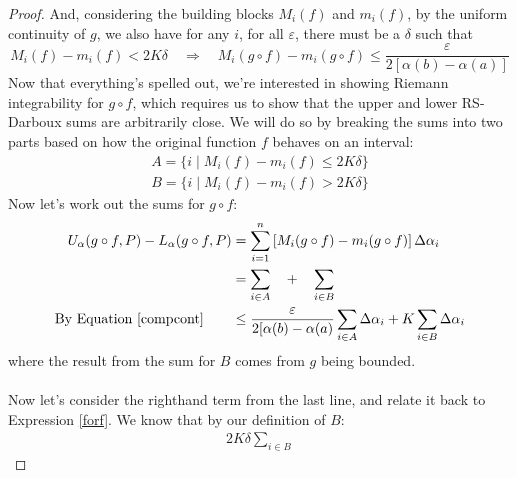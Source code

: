 \documentclass[12pt]{article}
\theoremstyle{plain}
\theoremstyle{definition}
\theoremstyle{remark}
\begin{document}
\begin{itemize}
\begin{proof}
            And, considering the building blocks $M_i(f)$ and 
            $m_i(f)$, by the uniform continuity of $g$, we
            also have for any $i$, for all $\varepsilon$, there must
            be a $\delta$ such that
            \begin{equation}
                \label{compcont}
                M_i(f) - m_i(f) < 2K{\delta}
                    \quad \Rightarrow \quad 
                    M_i(g\circ f) - m_i(g\circ f) \leq 
                    \frac{\varepsilon}{2[\alpha(b)-\alpha(a)]}
            \end{equation}
            Now that everything's spelled out, 
            we're interested in showing Riemann 
            integrability for $g\circ f$, which requires us
            to show that the upper and lower RS-Darboux sums
            are arbitrarily close. We will do so by breaking
            the sums into two parts based on how
            the original function $f$ behaves on an interval:
            \begin{align*}
                A = \{ i \; | \; M_i(f) - m_i(f)\leq2K\delta\}\\
                B = \{ i \; | \; M_i(f) - m_i(f)>2K\delta\}
            \end{align*}
            Now let's work out the sums for $g\circ f$:
            \begin{align}
                U_\alpha(g\circ f,P) - L_\alpha(g\circ f,P)
                    &= \sum^n_{i=1} \left[
                    M_i(g\circ f) - m_i(g\circ f)\right]
                    \Delta\alpha_i \notag\\
                &= \sum_{i\in A} \quad + \quad
                    \sum_{i\in B} \notag\\
                \text{By Equation \ref{compcont}} \qquad
                &\leq \frac{\varepsilon}{2[\alpha(b)-\alpha(a)} 
                    \sum_{i\in A} \Delta\alpha_i+
                    K \sum_{i\in B} \Delta\alpha_i
                    \label{final}
            \end{align}
            where the result from the sum for $B$ comes from $g$
            being bounded.
            \\
            \\
            Now let's consider the righthand term from the last
            line, and relate it back to Expression \ref{forf}.
            We know that by our definition of $B$:
            \begin{align*}
                {2K}{\delta} \sum_{i\in B} 

\end{align*}
\end{proof}
\end{itemize}
\end{document}
